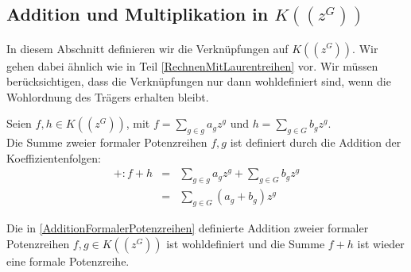 \subsection{Addition und Multiplikation in $K((z^{G}))$}
%
%
%
%
%
%
In diesem Abschnitt definieren wir die Verknüpfungen auf $K((z^{G}))$. Wir gehen dabei ähnlich wie in Teil \ref{RechnenMitLaurentreihen} vor. Wir müssen berücksichtigen, dass die Verknüpfungen nur dann wohldefiniert sind, wenn die Wohlordnung des Trägers erhalten bleibt.
%
%
%
%
%
%
%
%
%
\begin{defn}\label{AdditionFormalerPotenzreihen}
Seien $f, h \in K\left(\left(z^G\right)\right)$, mit $f = \sum_{g \in g}^{} a_g z^g \text{ und } h = \sum_{g \in G}^{} b_g z^g$.\\
Die Summe zweier formaler Potenzreihen $f, g$ ist definiert durch die Addition der Koeffizientenfolgen:
%
\begin{eqnarray*}
+ \colon f + h &=& \sum_{g \in g}^{} a_g z^g + \sum_{g \in G}^{} b_g z^g \\
&=& \sum_{g \in G}^{}\left(a_g + b_g\right)z^g 
\end{eqnarray*}
%

\end{defn}
%
%
%
%
%
\begin{satz}\label{wohldefiniertheitAddition}
Die in \ref{AdditionFormalerPotenzreihen} definierte Addition zweier formaler Potenzreihen $f, g \in K\left(\left(z^{G}\right)\right)$ ist wohldefiniert und die Summe $f +h$ ist wieder eine formale Potenzreihe.
\end{satz}
